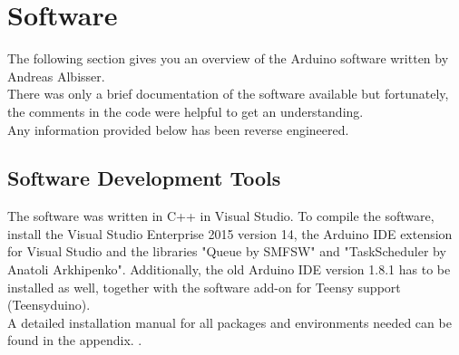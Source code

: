 \section{Software} \label{sec:txtArduinoSoftwareAnalysis}
%
%
The following section gives you an overview of the Arduino software written by Andreas Albisser. \\
There was only a brief documentation of the software available but fortunately, the comments in the code were helpful to get an understanding.\\
Any information provided below has been reverse engineered.\\
%
\subsection{Software Development Tools}
The software was written in C++ in Visual Studio. To compile the software, install the Visual Studio Enterprise 2015 version 14, the Arduino IDE extension for Visual Studio and the libraries "Queue by SMFSW" and "TaskScheduler by Anatoli Arkhipenko". Additionally, the old Arduino IDE version 1.8.1 has to be installed as well, together with the software add-on for Teensy support (Teensyduino).\\
A detailed installation manual for all packages and environments needed can be found in the appendix. .
%
